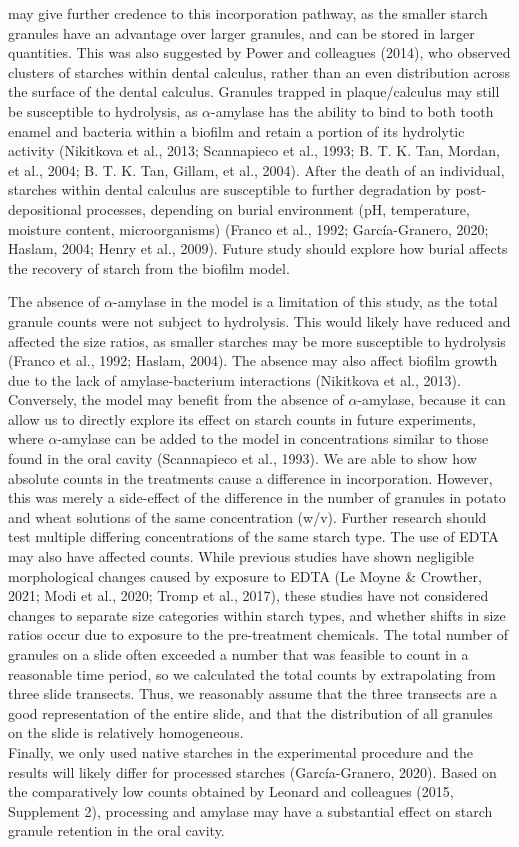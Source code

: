 \documentclass[
  letterpaper,
]{book}
\begin{document}
may give further credence to this incorporation pathway, as the smaller
starch granules have an advantage over larger granules, and can be
stored in larger quantities. This was also suggested by Power and
colleagues (2014), who observed clusters of starches within dental
calculus, rather than an even distribution across the surface of the
dental calculus. Granules trapped in plaque/calculus may still be
susceptible to hydrolysis, as \(\alpha\)-amylase has the ability to bind
to both tooth enamel and bacteria within a biofilm and retain a portion
of its hydrolytic activity (Nikitkova et al., 2013; Scannapieco et al.,
1993; B. T. K. Tan, Mordan, et al., 2004; B. T. K. Tan, Gillam, et al.,
2004). After the death of an individual, starches within dental calculus
are susceptible to further degradation by post-depositional processes,
depending on burial environment (pH, temperature, moisture content,
microorganisms) (Franco et al., 1992; García-Granero, 2020; Haslam,
2004; Henry et al., 2009). Future study should explore how burial
affects the recovery of starch from the biofilm model.

The absence of \(\alpha\)-amylase in the model is a limitation of this
study, as the total granule counts were not subject to hydrolysis. This
would likely have reduced and affected the size ratios, as smaller
starches may be more susceptible to hydrolysis (Franco et al., 1992;
Haslam, 2004). The absence may also affect biofilm growth due to the
lack of amylase-bacterium interactions (Nikitkova et al., 2013).
Conversely, the model may benefit from the absence of
\(\alpha\)-amylase, because it can allow us to directly explore its
effect on starch counts in future experiments, where \(\alpha\)-amylase
can be added to the model in concentrations similar to those found in
the oral cavity (Scannapieco et al., 1993). We are able to show how
absolute counts in the treatments cause a difference in incorporation.
However, this was merely a side-effect of the difference in the number
of granules in potato and wheat solutions of the same concentration
(w/v). Further research should test multiple differing concentrations of
the same starch type. The use of EDTA may also have affected counts.
While previous studies have shown negligible morphological changes
caused by exposure to EDTA (Le Moyne \& Crowther, 2021; Modi et al.,
2020; Tromp et al., 2017), these studies have not considered changes to
separate size categories within starch types, and whether shifts in size
ratios occur due to exposure to the pre-treatment chemicals. The total
number of granules on a slide often exceeded a number that was feasible
to count in a reasonable time period, so we calculated the total counts
by extrapolating from three slide transects. Thus, we reasonably assume
that the three transects are a good representation of the entire slide,
and that the distribution of all granules on the slide is relatively
homogeneous.\\
Finally, we only used native starches in the experimental procedure and
the results will likely differ for processed starches (García-Granero,
2020). Based on the comparatively low counts obtained by Leonard and
colleagues (2015, Supplement 2), processing and amylase may have a
substantial effect on starch granule retention in the oral cavity.
\end{document}
